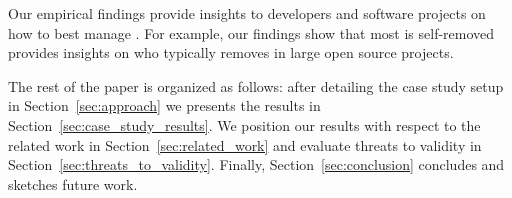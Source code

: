 Our empirical findings provide insights to developers and software projects  on how to best manage \SATD. For example, our findings show that most \SATD is self-removed provides insights on who typically removes \SATD in large open source projects.

The rest of the paper is organized as follows: after detailing the case study setup in Section~\ref{sec:approach} we presents the results in Section~\ref{sec:case_study_results}. We position our results with respect to the related work in Section~\ref{sec:related_work} and evaluate threats to validity in Section~\ref{sec:threats_to_validity}. Finally, Section~\ref{sec:conclusion} concludes and sketches future work.






